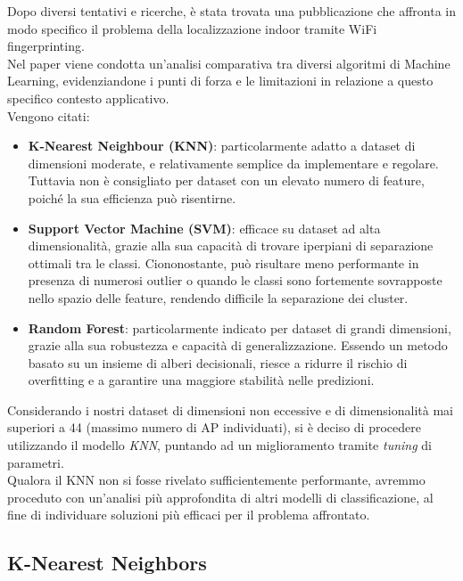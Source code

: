 \documentclass{article}
\begin{document}
Dopo diversi tentativi e ricerche, è stata trovata una pubblicazione \cite{Shang2022} che affronta in modo specifico il problema della localizzazione indoor tramite WiFi fingerprinting.\\
Nel paper viene condotta un'analisi comparativa tra diversi algoritmi di Machine Learning, evidenziandone i punti di forza e le limitazioni in relazione a questo specifico contesto applicativo.\\
Vengono citati:
\begin{itemize}
    \item \textbf{K-Nearest Neighbour (KNN)}: particolarmente adatto a dataset di dimensioni moderate, e relativamente semplice da implementare e regolare. Tuttavia non è consigliato per dataset con un elevato numero di feature, poiché la sua efficienza può risentirne.
    \item \textbf{Support Vector Machine (SVM)}: efficace su dataset ad alta dimensionalità, grazie alla sua capacità di trovare iperpiani di separazione ottimali tra le classi. Ciononostante, può risultare meno performante in presenza di numerosi outlier o quando le classi sono fortemente sovrapposte nello spazio delle feature, rendendo difficile la separazione dei cluster.
    \item \textbf{Random Forest}: particolarmente indicato per dataset di grandi dimensioni, grazie alla sua robustezza e capacità di generalizzazione. Essendo un metodo basato su un insieme di alberi decisionali, riesce a ridurre il rischio di overfitting e a garantire una maggiore stabilità nelle predizioni.
\end{itemize}

Considerando i nostri dataset di dimensioni non eccessive e di dimensionalità mai superiori a 44 (massimo numero di AP individuati), si è deciso di procedere utilizzando il modello \textit{KNN}, puntando ad un miglioramento tramite \textit{tuning} di parametri.\\
Qualora il KNN non si fosse rivelato sufficientemente performante, avremmo proceduto con un'analisi più approfondita di altri modelli di classificazione, al fine di individuare soluzioni più efficaci per il problema affrontato.

\subsection{K-Nearest Neighbors}
\end{document}
